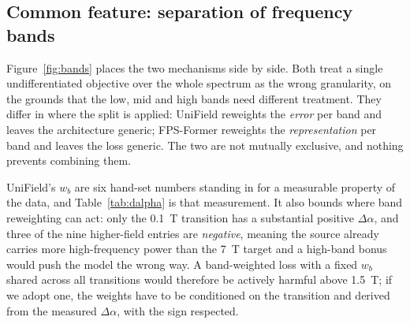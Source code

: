 \documentclass[11pt,a4paper]{article}
\begin{document}
\subsection{Common feature: separation of frequency bands}
\label{sec:thread}

Figure~\ref{fig:bands} places the two mechanisms side by side. Both treat a single undifferentiated
objective over the whole spectrum as the wrong granularity, on the grounds that the low, mid and high
bands need different treatment. They differ in where the split is applied: UniField
reweights the \emph{error} per band and leaves the architecture generic; FPS-Former reweights the
\emph{representation} per band and leaves the loss generic. The two are not mutually exclusive, and
nothing prevents combining them.

UniField's $w_b$ are six hand-set numbers standing in for a measurable property of the data, and
Table~\ref{tab:dalpha} is that measurement. It also bounds where band reweighting can act: only the
\SI{0.1}{\tesla} transition has a substantial positive $\Delta\alpha$, and three of the nine
higher-field entries are \emph{negative}, meaning the source already carries more high-frequency power
than the \SI{7}{\tesla} target and a high-band bonus would push the model the wrong way. A band-weighted
loss with a fixed $w_b$ shared across all transitions would therefore be actively harmful above
\SI{1.5}{\tesla}; if we adopt one, the weights have to be conditioned on the transition and derived from
the measured $\Delta\alpha$, with the sign respected.
\end{document}
